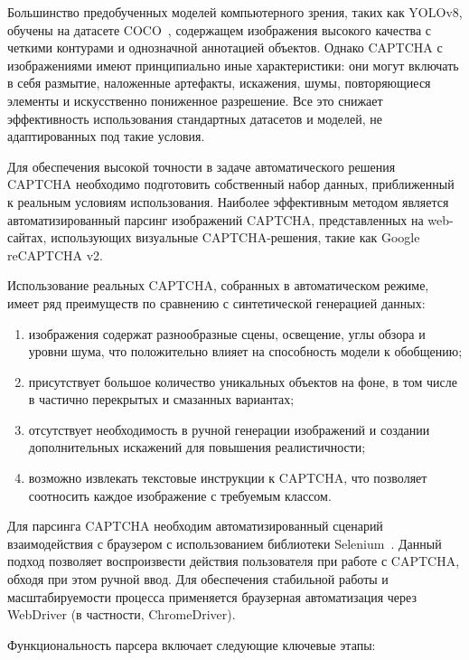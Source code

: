 Большинство предобученных моделей компьютерного зрения, таких как YOLOv8, обучены 
на датасете COCO~\cite{COCO}, содержащем изображения высокого качества с четкими 
контурами и однозначной аннотацией объектов. Однако CAPTCHA с изображениями имеют 
принципиально иные характеристики: они могут включать в себя размытие, наложенные 
артефакты, искажения, шумы, повторяющиеся элементы и искусственно пониженное 
разрешение. Все это снижает эффективность использования стандартных датасетов и 
моделей, не адаптированных под такие условия.

Для обеспечения высокой точности в задаче автоматического решения CAPTCHA 
необходимо подготовить собственный набор данных, приближенный к реальным условиям 
использования. Наиболее эффективным методом является автоматизированный парсинг 
изображений CAPTCHA, представленных на web-сайтах, использующих визуальные 
CAPTCHA-решения, такие как Google reCAPTCHA v2.

Использование реальных CAPTCHA, собранных в автоматическом режиме, имеет ряд 
преимуществ по сравнению с синтетической генерацией данных:

\begin{enumerate}
    \item изображения содержат разнообразные сцены, освещение, углы обзора и 
    уровни шума, что положительно влияет на способность модели к обобщению;
    \item присутствует большое количество уникальных объектов на фоне, в том 
    числе в частично перекрытых и смазанных вариантах;
    \item отсутствует необходимость в ручной генерации изображений и создании 
    дополнительных искажений для повышения реалистичности;
    \item возможно извлекать текстовые инструкции к CAPTCHA, что позволяет 
    соотносить каждое изображение с требуемым классом.
\end{enumerate}

Для парсинга CAPTCHA необходим автоматизированный сценарий взаимодействия с 
браузером с использованием библиотеки Selenium~\cite{Selenium}. Данный подход 
позволяет воспроизвести действия пользователя при работе с CAPTCHA, обходя при 
этом ручной ввод. Для обеспечения стабильной работы и масштабируемости процесса 
применяется браузерная автоматизация через WebDriver (в частности, ChromeDriver).

Функциональность парсера включает следующие ключевые этапы:

